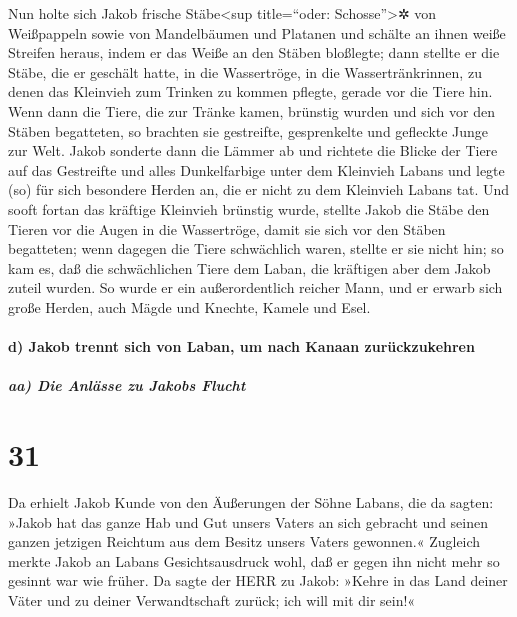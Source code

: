  Nun holte sich Jakob frische Stäbe\textless sup
title=``oder: Schosse''\textgreater✲ von Weißpappeln sowie von
Mandelbäumen und Platanen und schälte an ihnen weiße Streifen heraus,
indem er das Weiße an den Stäben bloßlegte;  dann stellte
er die Stäbe, die er geschält hatte, in die Wassertröge, in die
Wassertränkrinnen, zu denen das Kleinvieh zum Trinken zu kommen pflegte,
gerade vor die Tiere hin. Wenn dann die Tiere, die zur Tränke kamen,
brünstig wurden  und sich vor den Stäben begatteten, so
brachten sie gestreifte, gesprenkelte und gefleckte Junge zur Welt.
 Jakob sonderte dann die Lämmer ab und richtete die
Blicke der Tiere auf das Gestreifte und alles Dunkelfarbige unter dem
Kleinvieh Labans und legte (so) für sich besondere Herden an, die er
nicht zu dem Kleinvieh Labans tat.  Und sooft fortan das
kräftige Kleinvieh brünstig wurde, stellte Jakob die Stäbe den Tieren
vor die Augen in die Wassertröge, damit sie sich vor den Stäben
begatteten;  wenn dagegen die Tiere schwächlich waren,
stellte er sie nicht hin; so kam es, daß die schwächlichen Tiere dem
Laban, die kräftigen aber dem Jakob zuteil wurden.  So
wurde er ein außerordentlich reicher Mann, und er erwarb sich große
Herden, auch Mägde und Knechte, Kamele und Esel.

\hypertarget{d-jakob-trennt-sich-von-laban-um-nach-kanaan-zuruxfcckzukehren}{%
\paragraph{d) Jakob trennt sich von Laban, um nach Kanaan
zurückzukehren}\label{d-jakob-trennt-sich-von-laban-um-nach-kanaan-zuruxfcckzukehren}}

\hypertarget{aa-die-anluxe4sse-zu-jakobs-flucht}{%
\subparagraph{aa) Die Anlässe zu Jakobs
Flucht}\label{aa-die-anluxe4sse-zu-jakobs-flucht}}

\hypertarget{section-30}{%
\section{31}\label{section-30}}

 Da erhielt Jakob Kunde von den Äußerungen der Söhne
Labans, die da sagten: »Jakob hat das ganze Hab und Gut unsers Vaters an
sich gebracht und seinen ganzen jetzigen Reichtum aus dem Besitz unsers
Vaters gewonnen.«  Zugleich merkte Jakob an Labans
Gesichtsausdruck wohl, daß er gegen ihn nicht mehr so gesinnt war wie
früher.  Da sagte der HERR zu Jakob: »Kehre in das Land
deiner Väter und zu deiner Verwandtschaft zurück; ich will mit dir
sein!«

